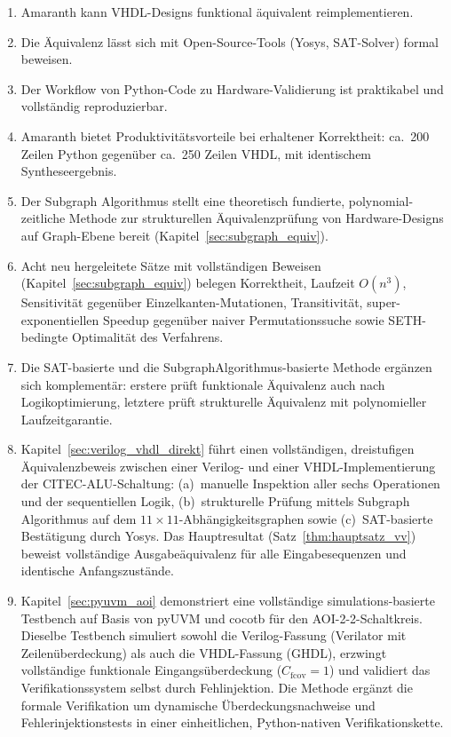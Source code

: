 ﻿\documentclass[12pt,a4paper]{report}
\begin{document}
\begin{enumerate}
    \item Amaranth kann VHDL-Designs funktional äquivalent reimplementieren.
    \item Die Äquivalenz lässt sich mit Open-Source-Tools (Yosys, SAT-Solver) formal beweisen.
    \item Der Workflow von Python-Code zu Hardware-Validierung ist praktikabel und vollstän\-dig reproduzierbar.
    \item Amaranth bietet Produktivitätsvorteile bei erhaltener Korrektheit: ca.~200 Zeilen Python gegenüber ca.~250 Zeilen VHDL, mit identischem Syntheseergebnis.
    \item Der Subgraph Algorithmus \cite{subgraph2026} stellt eine theoretisch fundierte,
          polynomial-zeitliche Methode zur strukturellen Äquivalenzprüfung von
          Hardware-Designs auf Graph-Ebene bereit (Kapitel~\ref{sec:subgraph_equiv}).
    \item Acht neu hergeleitete Sätze mit vollständigen Beweisen (Kapitel~\ref{sec:subgraph_equiv}) belegen
          Korrektheit, Laufzeit $O(n^3)$, Sensitivität gegenüber Einzelkanten-Mutationen,
          Transitivität, super-exponentiellen Speedup gegenüber naiver Permutationssuche
          sowie SETH-bedingte Optimalität des Verfahrens.
    \item Die SAT-basierte und die Subgraph\-Algorithmus-basierte Me\-tho\-de ergänzen sich
          komplementär: erstere prüft funktionale Äquivalenz auch nach Logikoptimierung,
          letztere prüft strukturelle Äquivalenz mit polynomieller Laufzeitgarantie.
    \item Kapitel~\ref{sec:verilog_vhdl_direkt} führt einen vollständigen, dreistufigen Äquivalenzbeweis
          zwischen einer Verilog- und einer VHDL-Implementierung der CITEC-ALU-Schaltung:
          (a)~manuelle Inspektion aller sechs Operationen und der sequentiellen Logik,
          (b)~strukturelle Prüfung mittels Subgraph Algorithmus auf dem
          $11 \times 11$-Abhängigkeitsgraphen sowie
          (c)~SAT-basierte Bestätigung durch Yosys.  Das Hauptresultat
          (Satz~\ref{thm:hauptsatz_vv}) beweist vollständige Ausgabeäquivalenz
          für alle Eingabesequenzen und identische Anfangszustände.
    \item Kapitel~\ref{sec:pyuvm_aoi} demonstriert eine vollständige simulations-basierte
          Testbench auf Basis von pyUVM \cite{pyuvm2024} und cocotb \cite{cocotb2024} für
          den AOI-2-2-Schaltkreis. Dieselbe Testbench simuliert sowohl die Verilog-Fassung
          (Verilator mit Zeilenüberdeckung) als auch die VHDL-Fassung (GHDL), erzwingt
          vollständige funktionale Eingangsüberdeckung ($C_{\mathrm{fcov}} = 1$) und
          validiert das Verifikationssystem selbst durch Fehlinjektion. Die Methode ergänzt
          die formale Verifikation um dynamische Überdeckungs\-nachweise und Fehlerinjektionstests
          in einer einheitlichen, Python-nativen Verifikationskette.
\end{enumerate}
\end{document}
